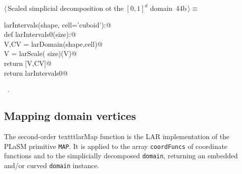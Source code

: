 \documentclass[11pt,oneside]{article}    %
\begin{document}
\begin{flushleft} \small \label{scrap71}
\protect{}$\langle\,$Scaled simplicial decomposition ot the $[0,1]^d$ domain\nobreak\ {\footnotesize 44b}$\,\rangle\equiv$
\vspace{-1ex}
\begin{list}{}{} \item
\mbox{}\verb@def larIntervals(shape, cell='cuboid'):@\\
\mbox{}\verb@    def larIntervals0(size):@\\
\mbox{}\verb@        V,CV = larDomain(shape,cell)@\\
\mbox{}\verb@        V = larScale( size)(V)@\\
\mbox{}\verb@        return [V,CV]@\\
\mbox{}\verb@    return larIntervals0@\\
\mbox{}\verb@@{\NWsep}
\end{list}
\vspace{-1ex}
\footnotesize\addtolength{\baselineskip}{-1ex}
\begin{list}{}{\setlength{\itemsep}{-\parsep}\setlength{\itemindent}{-\leftmargin}}
\item \NWtxtMacroRefIn\ .
\end{list}
\end{flushleft}

\subsection{Mapping domain vertices}
The second-order texttt{larMap} function is the LAR implementation of the PLaSM primitive \texttt{MAP}.
It is applied to the array \texttt{coordFuncs} of coordinate functions and to the simplicially decomposed  \texttt{domain}, returning an embedded and/or curved \texttt{domain} instance.
\end{document}
